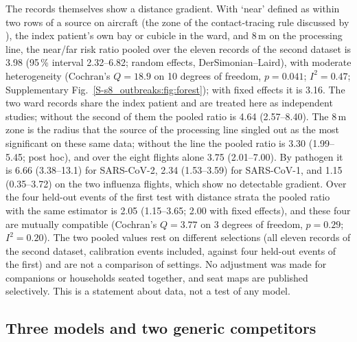 The records themselves show a distance gradient. With `near' defined as within two rows of a source on aircraft
(the zone of the contact-tracing rule discussed by \citet{hertzberg2016risk}), the index patient's own bay or
cubicle in the ward, and 8\,m on the processing line, the near/far risk ratio pooled over the eleven records of
the second dataset is 3.98 (95\,\% interval 2.32--6.82; random effects, DerSimonian--Laird), with moderate
heterogeneity (Cochran's $Q=18.9$ on 10 degrees of freedom, $p=0.041$; $I^2=0.47$; Supplementary
Fig.~\ref{S-s8_outbreaks:fig:forest}); with fixed effects it is 3.16. The two ward records share the index
patient and are treated here as independent studies; without the second of them the pooled ratio is 4.64
(2.57--8.40). The 8\,m zone is the radius that the source of the processing line singled out as the most
significant on these same data; without the line the pooled ratio is 3.30 (1.99--5.45; post hoc), and over the
eight flights alone 3.75 (2.01--7.00). By pathogen it is 6.66 (3.38--13.1) for SARS-CoV-2, 2.34 (1.53--3.59)
for SARS-CoV-1, and 1.15 (0.35--3.72) on the two influenza flights, which show no detectable gradient. Over the
four held-out events of the first test with distance strata the pooled ratio with the same estimator is 2.05
(1.15--3.65; 2.00 with fixed effects), and these four are mutually compatible (Cochran's $Q=3.77$ on 3 degrees
of freedom, $p=0.29$; $I^2=0.20$). The two pooled values rest on different selections (all eleven records of the
second dataset, calibration events included, against four held-out events of the first) and are not a
comparison of settings. No adjustment was made for companions or households seated together, and seat maps are
published selectively. This is a statement about data, not a test of any model.

\subsection{Three models and two generic competitors}\label{s8_outbreaks:sec:models}

